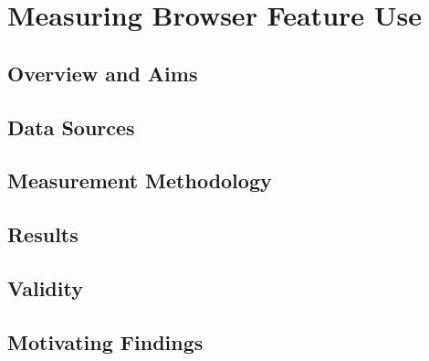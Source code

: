\chapter{Measuring Browser Feature Use}
\section{Overview and Aims}
\section{Data Sources}
\section{Measurement Methodology}
\section{Results}
\section{Validity}
\section{Motivating Findings}
